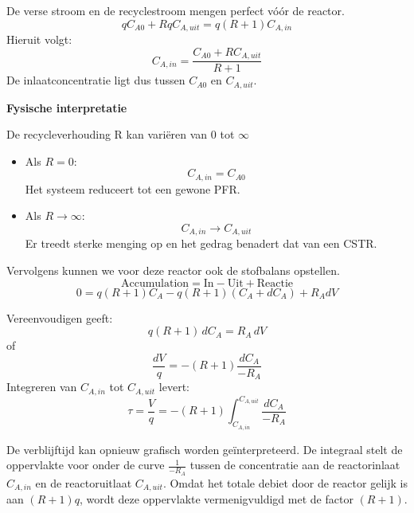 \documentclass{ximera}
\begin{document}
De verse stroom en de recyclestroom mengen perfect vóór de reactor.
\[
q C_{A0} + R q C_{A,uit} = q (R+1) C_{A,in}
\]
Hieruit volgt:
\[
C_{A,in} = \frac{C_{A0} + R C_{A,uit}}{R+1}
\]
De inlaatconcentratie ligt dus tussen $C_{A0}$ en $C_{A,uit}$.\\

\begin{remark} \textbf{Fysische interpretatie}

De recycleverhouding R kan variëren van $0$ tot $\infty$
\begin{itemize}
\item Als $R = 0$:
\[
C_{A,in} = C_{A0}
\]
Het systeem reduceert tot een gewone PFR.
\item Als $R \rightarrow \infty$:
\[
C_{A,in} \rightarrow C_{A,uit}
\]
Er treedt sterke menging op en het gedrag benadert dat van een CSTR.
\end{itemize}
\end{remark}

Vervolgens kunnen we voor deze reactor ook de stofbalans opstellen. 
\[
\text{Accumulation} = \text{In} - \text{Uit} + \text{Reactie}
\]
\[
0 = q(R+1)C_A - q(R+1)(C_A + dC_A) + R_A dV 
\]

Vereenvoudigen geeft:
\[
q(R+1)\, dC_A = R_A \, dV
\]
of
\[
\frac{dV}{q} = -(R+1)\frac{dC_A}{-R_A}
\]
Integreren van $C_{A,in}$ tot $C_{A,uit}$ levert:
\[
\tau = \frac{V}{q} 
= -(R+1)\int_{C_{A,in}}^{C_{A,uit}} \frac{dC_A}{-R_A}
\]

De verblijftijd kan opnieuw grafisch worden geïnterpreteerd.
De integraal stelt de oppervlakte voor onder de curve
$\frac{1}{-R_A}$ tussen de concentratie aan de reactorinlaat
$C_{A,in}$ en de reactoruitlaat $C_{A,uit}$.
Omdat het totale debiet door de reactor gelijk is aan
$(R+1)q$, wordt deze oppervlakte vermenigvuldigd met de factor
$(R+1)$.

\begin{image}
\end{image}
\end{document}
